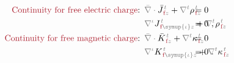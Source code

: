 \begin{subequations} \label{eq:Div-em-f}
	\abovedisplayskip=-4pt
	\belowdisplayskip=10pt
\begin{align}
	\textcolor{Maroon}{\text{Continuity for free electric charge}}\text{:}&\hspace{0.5em} \mathcolor{gray}{\bar{\nabla} \cdot} \bar{J}^{\;\!\mathcolor{gray}{t}}_{\;\!\textcolor{Maroon}{\text{f}}\mathcolor{gray}{z}} + \mathcolor{gray}{\nabla^t} {\rho}^{\;\!\mathcolor{gray}{t}}_{\;\!\textcolor{Maroon}{\text{f}}\mathcolor{gray}{z}} \hspace{-5.3em} &&= 0 \label{eq:Div-e-f} \\ 
	&\hspace{0.5em} \mathcolor{gray}{\nabla^\iota} J^{\;\!\mathcolor{gray}{t}}_{\;\!\textcolor{Maroon}{\text{f}} \mathcolor{gray}{\symup{\iota}}\mathcolor{gray}{z}} + \mathcolor{gray}{\nabla^t} {\rho}^{\;\!\mathcolor{gray}{t}}_{\;\!\textcolor{Maroon}{\text{f}}\mathcolor{gray}{z}} \hspace{-5.3em} &&= 0~, \label{eq:div-e-f} \\ 
	\textcolor{Maroon}{\text{Continuity for free magnetic charge}}\text{:}&\hspace{0.5em} \mathcolor{gray}{\bar{\nabla} \cdot} \bar{K}^{\;\!\mathcolor{gray}{t}}_{\;\!\textcolor{Maroon}{\text{f}}\mathcolor{gray}{z}} + \mathcolor{gray}{\nabla^t} {\kappa}^{\;\!\mathcolor{gray}{t}}_{\;\!\textcolor{Maroon}{\text{f}}\mathcolor{gray}{z}} \hspace{-5.3em} &&= 0 \label{eq:Div-m-f} \\
	&\hspace{0.5em} \mathcolor{gray}{\nabla^\iota} {K}^{\;\!\mathcolor{gray}{t}}_{\;\!\textcolor{Maroon}{\text{f}} \mathcolor{gray}{\symup{\iota}}\mathcolor{gray}{z}} + \mathcolor{gray}{\nabla^t} {\kappa}^{\;\!\mathcolor{gray}{t}}_{\;\!\textcolor{Maroon}{\text{f}}\mathcolor{gray}{z}} \hspace{-5.3em} &&= 0~. \label{eq:div-m-f}
\end{align}
\end{subequations}
